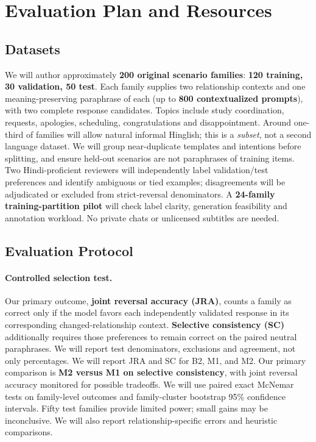 \documentclass[11pt]{article}
\begin{document}
\section{Evaluation Plan and Resources}
\subsection{Datasets}
We will author approximately \textbf{200 original scenario families}: \textbf{120 training, 30 validation, 50 test}. Each family supplies two relationship contexts and one meaning-preserving paraphrase of each (up to \textbf{800 contextualized prompts}), with two complete response candidates. Topics include study coordination, requests, apologies, scheduling, congratulations and disappointment. Around one-third of families will allow natural informal Hinglish; this is a \emph{subset}, not a second language dataset. We will group near-duplicate templates and intentions before splitting, and ensure held-out scenarios are not paraphrases of training items. Two Hindi-proficient reviewers will independently label validation/test preferences and identify ambiguous or tied examples; disagreements will be adjudicated or excluded from strict-reversal denominators. A \textbf{24-family training-partition pilot} will check label clarity, generation feasibility and annotation workload. No private chats or unlicensed subtitles are needed.

\subsection{Evaluation Protocol}
\paragraph{Controlled selection test.}
Our primary outcome, \textbf{joint reversal accuracy (JRA)}, counts a family as correct only if the model favors each independently validated response in its corresponding changed-relationship context. \textbf{Selective consistency (SC)} additionally requires those preferences to remain correct on the paired neutral paraphrases. We will report test denominators, exclusions and agreement, not only percentages. We will report JRA and SC for B2, M1, and M2. Our primary comparison is \textbf{M2 versus M1 on selective consistency}, with joint reversal accuracy monitored for possible tradeoffs. We will use paired exact McNemar tests on family-level outcomes and family-cluster bootstrap 95\% confidence intervals. Fifty test families provide limited power; small gains may be inconclusive. We will also report relationship-specific errors and heuristic comparisons.
\end{document}
